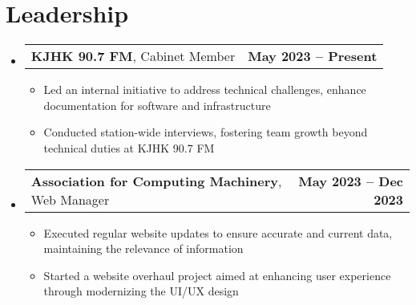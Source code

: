 \documentclass[letter,11pt]{article}
\makeatletter
\newcommand{\resumeItem}[1]{
	\item \small{{#1 \vspace{-2pt}}}
}
\newcommand{\resumeSubheading}[3]{
	\vspace{-2pt}\item
	\begin{tabular*}{1.0\textwidth}[t]{l@{\extracolsep{\fill}}r}
		\textbf{#1}, {\small #2} & \textbf{\small #3} \\
	\end{tabular*}\vspace{-5pt}
}
\newcommand{\resumeSubHeadingListStart}{\begin{itemize}[leftmargin=0.0in, label={}]}
\newcommand{\resumeSubHeadingListEnd}{\end{itemize}}
\newcommand{\resumeItemListStart}{\begin{itemize}[leftmargin=0.5cm]}
\newcommand{\resumeItemListEnd}{\end{itemize}\vspace{-5pt}}
\makeatother
\begin{document}
\section{Leadership}
	\resumeSubHeadingListStart
		\resumeSubheading{KJHK 90.7 FM}{Cabinet Member}{May 2023 -- Present}
			\resumeItemListStart
				\resumeItem{Led an internal initiative to address technical challenges, enhance documentation for software and infrastructure}
				\resumeItem{Conducted station-wide interviews, fostering team growth beyond technical duties at KJHK 90.7 FM}
			\resumeItemListEnd
		\resumeSubheading{Association for Computing Machinery}{Web Manager}{May 2023 -- Dec 2023}
			\resumeItemListStart
				\resumeItem{Executed regular website updates to ensure accurate and current data, maintaining the relevance of information}
				\resumeItem{Started a website overhaul project aimed at enhancing user experience through modernizing the UI/UX design}
			\resumeItemListEnd
	\resumeSubHeadingListEnd
\end{document}
